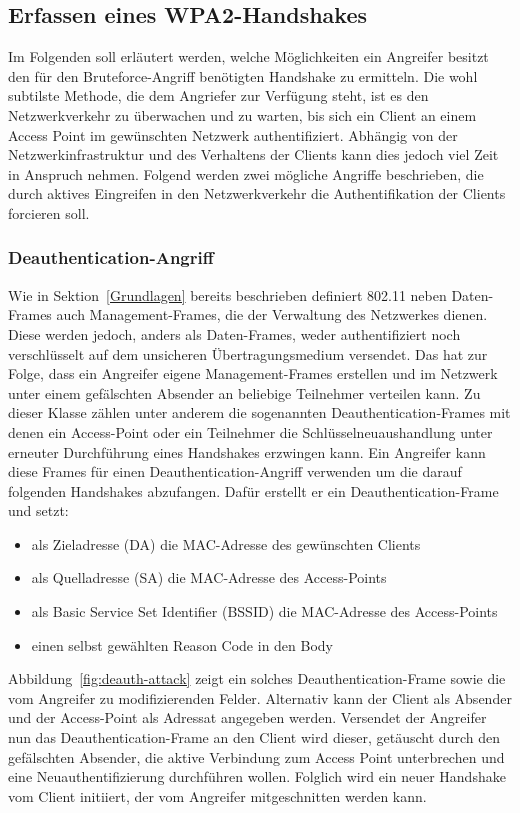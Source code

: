 \subsection{Erfassen eines WPA2-Handshakes}
Im Folgenden soll erläutert werden, welche Möglichkeiten ein Angreifer besitzt den für den Bruteforce-Angriff benötigten Handshake zu ermitteln. 
Die wohl subtilste Methode, die dem Angriefer zur Verfügung steht, ist es den Netzwerkverkehr zu überwachen und zu warten, bis sich ein Client an einem Access Point im gewünschten Netzwerk authentifiziert. 
Abhängig von der Netzwerkinfrastruktur und des Verhaltens der Clients kann dies jedoch viel Zeit in Anspruch nehmen.
Folgend werden zwei mögliche Angriffe beschrieben, die durch aktives Eingreifen in den Netzwerkverkehr die Authentifikation der Clients forcieren soll.

\subsubsection{Deauthentication-Angriff}
Wie in Sektion~\ref{Grundlagen} bereits beschrieben definiert 802.11 neben Daten-Frames auch Management-Frames, die der Verwaltung des Netzwerkes dienen.
Diese werden jedoch, anders als Daten-Frames, weder authentifiziert noch verschlüsselt auf dem unsicheren Übertragungsmedium versendet.
Das hat zur Folge, dass ein Angreifer eigene Management-Frames erstellen und im Netzwerk unter einem gefälschten Absender an beliebige Teilnehmer verteilen kann.
Zu dieser Klasse zählen unter anderem die sogenannten Deauthentication-Frames mit denen ein Access-Point oder ein Teilnehmer die Schlüsselneuaushandlung unter erneuter Durchführung eines Handshakes erzwingen kann.
Ein Angreifer kann diese Frames für einen Deauthentication-Angriff verwenden um die darauf folgenden Handshakes abzufangen.
Dafür erstellt er ein Deauthentication-Frame und setzt:
\begin{itemize}
	\item als Zieladresse (DA) die MAC-Adresse des gewünschten Clients
	\item als Quelladresse (SA) die MAC-Adresse des Access-Points
	\item als Basic Service Set Identifier (BSSID) die MAC-Adresse des Access-Points
	\item einen selbst gewählten Reason Code in den Body
\end{itemize}
Abbildung~\ref{fig:deauth-attack} zeigt ein solches Deauthentication-Frame sowie die vom Angreifer zu modifizierenden Felder.
Alternativ kann der Client als Absender und der Access-Point als Adressat angegeben werden.
Versendet der Angreifer nun das Deauthentication-Frame an den Client wird dieser, getäuscht durch den gefälschten Absender, die aktive Verbindung zum Access Point unterbrechen und eine Neuauthentifizierung durchführen wollen.
Folglich wird ein neuer Handshake vom Client initiiert, der vom Angreifer mitgeschnitten werden kann.

